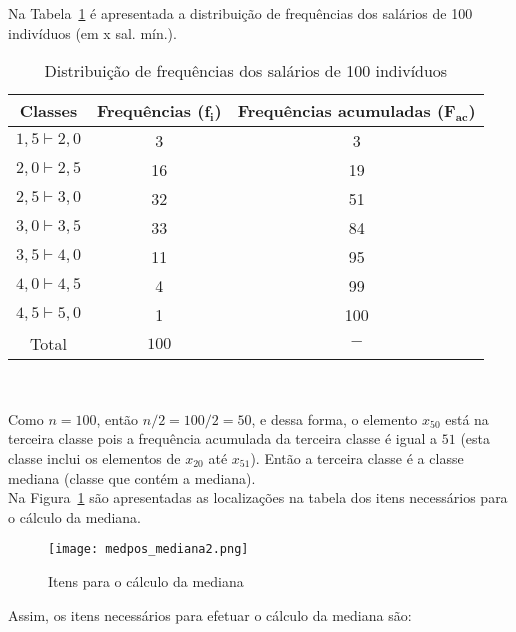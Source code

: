 \documentclass[11pt,fleqn]{book} %
\begin{document}
\vspace{0,5cm}


\begin{example}

Na Tabela~\ref{tab:distdadoscontinuos} é apresentada a distribuição de frequências dos salários de 100 indivíduos (em x sal. mín.).

	\begin{table}[h]
	\caption{Distribuição de frequências dos salários de 100 indivíduos}
	\label{tab:distdadoscontinuos} 
	\vspace{-0.1cm}
	\centering
	\begin{tabular}{c c c}
	\toprule
	\textbf{Classes} & \textbf{Frequências} ($\bm{f_i}$) & \textbf{Frequências acumuladas} ($\bm{F_{ac}}$) \\
	\midrule
	$1,5 \vdash 2,0$ & 3 & 3 \\
	$2,0 \vdash 2,5$ & 16 & 19 \\
	$2,5 \vdash 3,0$ & 32 & 51 \\
	$3,0 \vdash 3,5$ & 33 & 84 \\
	$3,5 \vdash 4,0$ & 11 & 95 \\
	$4,0 \vdash 4,5$ & 4 & 99 \\
	$4,5 \vdash 5,0$ & 1 & 100 \\
	\hline
	Total & $100$ & $-$\\
	\bottomrule
	\end{tabular} \\
	\end{table}
	
	
Como $n=100$, então $n/2=100/2=50$, e dessa forma, o elemento $x_{50}$ está na terceira classe pois a frequência acumulada da terceira classe é igual a $51$ (esta classe inclui os elementos de $x_{20}$ até $x_{51}$). Então a terceira classe é a classe mediana (classe que contém a mediana). \\

Na Figura~\ref{fig:medpos_mediana2} são apresentadas as localizações na tabela dos itens necessários para o cálculo da mediana. \\

\begin{figure}[h!]
\centering\texttt{[image: medpos\_mediana2.png]}
\caption{Itens para o cálculo da mediana}
\label{fig:medpos_mediana2} %
\end{figure}

Assim, os itens necessários para efetuar o cálculo da mediana são:


\end{example}
\end{document}
